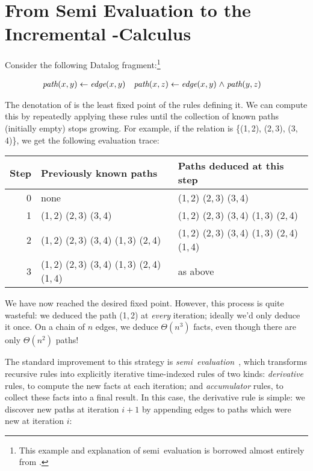 \section{From Semi\naive{} Evaluation to the Incremental \boldfn-Calculus}
\label{sec:seminaive-and-ilc}

Consider the following Datalog fragment:\footnote{This example and explanation
  of semi\naive\ evaluation is borrowed almost entirely from
  \citet{DBLP:conf/esop/Alvarez-Picallo19}.}

\begin{align*}
  \name{path}(x,y) &\gets \name{edge}(x,y)
  &
  \name{path}(x,z) &\gets \name{edge}(x,y) \wedge \name{path}(y,z)
\end{align*}


\noindent
The denotation of  is the least fixed point of the rules defining
it.
We can compute this by repeatedly applying these rules until the collection
of known paths (initially empty) stops growing.
%
For example, if the  relation is \{(1,\,2), (2,\,3), (3,\,4)\}, we
get the following evaluation trace:

\nopagebreak[2]
\begin{center}
  \setlength\tabcolsep{1em}
  \begin{tabular}{@{}rll@{}}
    Step
    & Previously known paths
    & Paths deduced at this step
    \\\midrule
    0
    & none
    & (1,\,2) (2,\,3) (3,\,4)
    \\
    1
    & (1,\,2) (2,\,3) (3,\,4)
    & (1,\,2) (2,\,3) (3,\,4) (1,\,3) (2,\,4)
    \\
    2
    & (1,\,2) (2,\,3) (3,\,4) (1,\,3) (2,\,4)
    & (1,\,2) (2,\,3) (3,\,4) (1,\,3) (2,\,4) (1,\,4)
    \\
    3
    & (1,\,2) (2,\,3) (3,\,4) (1,\,3) (2,\,4) (1,\,4)
    & as above
  \end{tabular}
\end{center}

\noindent We have now reached the desired fixed point. However, this process is
quite wasteful: we deduced the path (1,\,2) at \emph{every} iteration; ideally
we'd only deduce it once. On a chain of $n$ edges, we deduce $\Theta(n^3)$
facts, even though there are only $\Theta(n^2)$ paths!

The standard improvement to this strategy is
\emph{semi\naive\ evaluation}~\cite{seminaive}, which transforms recursive rules
into explicitly iterative time-indexed rules of two kinds: \emph{derivative}
rules, to compute the new facts at each iteration; and \emph{accumulator} rules,
to collect these facts into a final result.
%
In this case, the derivative rule is simple: we discover new paths at iteration
$i+1$ by appending edges to paths which were new at iteration $i$:

